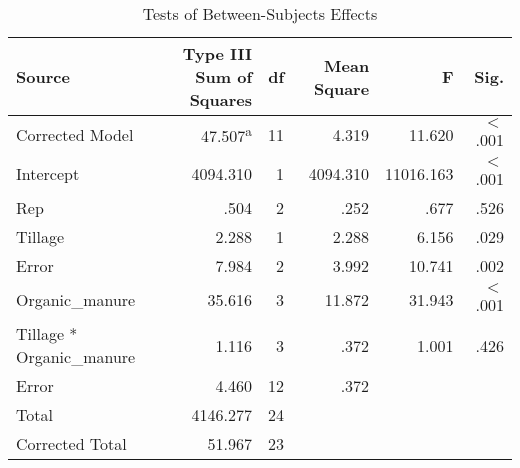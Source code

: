 \documentclass[oneside,12pt,fleqn]{book}
\begin{document}
\begin{table}[ht]
\centering
\begin{tabular}{lrrrrr}
\toprule
\textbf{Source} & \textbf{Type III Sum of Squares} & \textbf{df} & \textbf{Mean Square} & \textbf{F} & \textbf{Sig.} \\ \midrule
Corrected Model      & 47.507\textsuperscript{a} & 11 & 4.319  & 11.620  & $<$ .001 \\
Intercept            & 4094.310                  & 1  & 4094.310 & 11016.163 & $<$ .001 \\
Rep                  & .504                      & 2  & .252    & .677    & .526    \\
Tillage              & 2.288                     & 1  & 2.288   & 6.156   & .029    \\
Error       & 7.984                     & 2  & 3.992   & 10.741  & .002    \\
Organic\_manure      & 35.616                    & 3  & 11.872  & 31.943  & $<$ .001 \\
Tillage * Organic\_manure & 1.116                & 3  & .372    & 1.001   & .426    \\
Error                & 4.460                     & 12 & .372    &         &         \\
Total                & 4146.277                  & 24 &         &         &         \\
Corrected Total      & 51.967                    & 23 &         &         &         \\ \bottomrule
\end{tabular}
\caption{Tests of Between-Subjects Effects}
\end{table}
\end{document}
